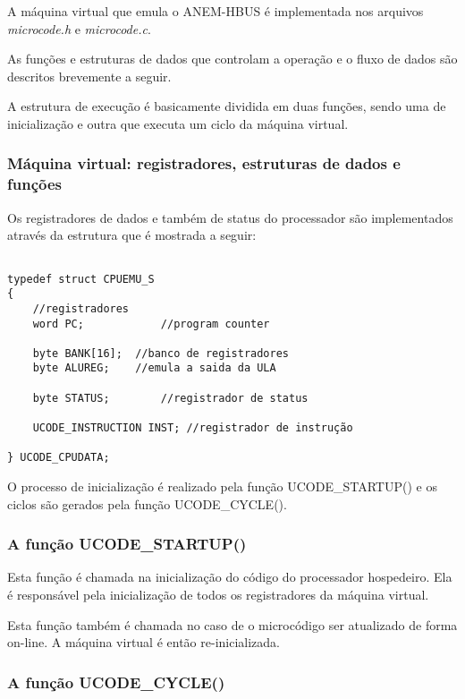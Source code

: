 A máquina virtual que emula o ANEM-HBUS é implementada nos arquivos \textit{microcode.h} e \textit{microcode.c}. 

As funções e estruturas de dados que controlam a operação e o fluxo de dados são descritos brevemente a seguir.

A estrutura de execução é basicamente dividida em duas funções, sendo uma de inicialização e outra que executa um ciclo da máquina virtual.

\subsubsection{Máquina virtual: registradores, estruturas de dados e funções}

Os registradores de dados e também de status do processador são implementados através da estrutura que é mostrada a seguir:

\begin{verbatim}

typedef struct CPUEMU_S
{
	//registradores
	word PC;			//program counter
	
	byte BANK[16];	//banco de registradores
	byte ALUREG; 	//emula a saida da ULA
	
	byte STATUS;		//registrador de status
	
	UCODE_INSTRUCTION INST; //registrador de instrução
	
} UCODE_CPUDATA;

\end{verbatim}

O processo de inicialização é realizado pela função UCODE\_STARTUP() e os ciclos são gerados pela função UCODE\_CYCLE().

\subsubsection{A função UCODE\_STARTUP()}

Esta função é chamada na inicialização do código do processador hospedeiro. Ela é responsável pela inicialização de todos os registradores da máquina virtual.

Esta função também é chamada no caso de o microcódigo ser atualizado de forma on-line. A máquina virtual é então re-inicializada.

\subsubsection{A função UCODE\_CYCLE()}

